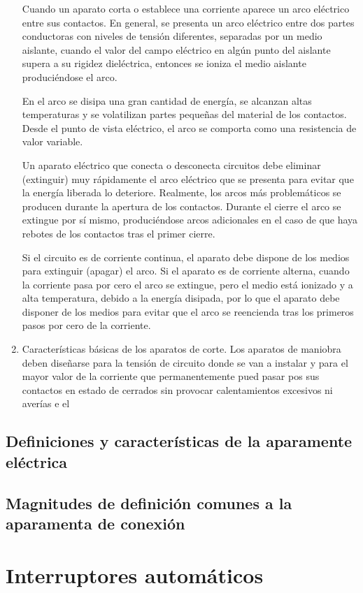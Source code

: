 \begin{enumerate}
    Cuando un aparato corta o establece una corriente aparece un arco eléctrico entre sus contactos. En general, se presenta un arco eléctrico entre dos partes conductoras con niveles de tensión diferentes, separadas por un medio aislante, cuando el valor del campo eléctrico en algún punto del aislante supera a su rigidez dieléctrica, entonces se ioniza el medio aislante produciéndose el arco.

    En el arco se disipa una gran cantidad de energía, se alcanzan altas temperaturas y se volatilizan partes pequeñas del material de los contactos. Desde el punto de vista eléctrico, el arco se comporta como una resistencia de valor variable.

    Un aparato eléctrico que conecta o desconecta circuitos debe eliminar (extinguir) muy rápidamente el arco eléctrico que se presenta para evitar que la energía liberada lo deteriore. Realmente, los arcos más problemáticos se producen durante la apertura de los contactos. Durante el cierre el arco se extingue por sí mismo, produciéndose arcos adicionales en el caso de que haya rebotes de los contactos tras el primer cierre.

    Si el circuito es de corriente continua, el aparato debe dispone de los medios para extinguir (apagar) el arco. Si el aparato es de corriente alterna, cuando la corriente pasa por cero el arco se extingue, pero el medio está ionizado y a alta temperatura, debido a la energía disipada, por lo que el aparato debe disponer de los medios para evitar que el arco se reencienda tras los primeros pasos por cero de la corriente.

    \item Características básicas de los aparatos de corte.
    Los aparatos de maniobra deben diseñarse para la tensión de circuito donde se van a instalar y para el mayor valor de la corriente que permanentemente pued pasar pos sus contactos en estado de cerrados sin provocar calentamientos excesivos ni averías e el
\end{enumerate}
\subsection{Definiciones y características de la aparamente eléctrica}
\subsection{Magnitudes de definición comunes a la aparamenta de conexión}

\section{Interruptores automáticos}
